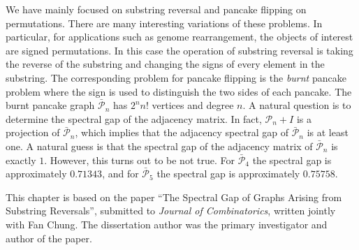 We have mainly focused on substring reversal and pancake flipping on permutations. There are many
interesting variations of these problems. In particular, for applications such as genome
rearrangement, the objects of interest are signed permutations.  In this case the operation of
substring reversal is taking the reverse of the substring and changing the signs of every element in
the substring.  The corresponding problem for pancake flipping is the {\it burnt} pancake problem
where the sign is used to distinguish the two sides of each pancake.  The burnt pancake graph
$\bar{\mathcal P}_n$ has $2^n n!$ vertices and degree $n$.  A natural question is to determine
the spectral gap of the adjacency matrix.  In fact, $\mathcal{P}_n + I$ is a projection of
$\bar{\mathcal{P}}_n$, which implies that the adjacency spectral gap of $\bar{\mathcal{P}}_n$ is
at least one.  A natural guess is that the spectral gap of the adjacency matrix of
$\bar{\mathcal P}_n$ is exactly $1$. However, this
turns out to be not true. For $\bar{\mathcal P}_4$ the spectral gap is approximately $0.71343$,
and for $\bar{\mathcal P}_5$ the spectral gap is approximately $0.75758$.  



This chapter is based on the paper ``The Spectral Gap of Graphs Arising from Substring Reversals'',
submitted to \textit{Journal of Combinatorics}, written jointly with Fan Chung.  The dissertation
author was the primary investigator and author of the paper.
